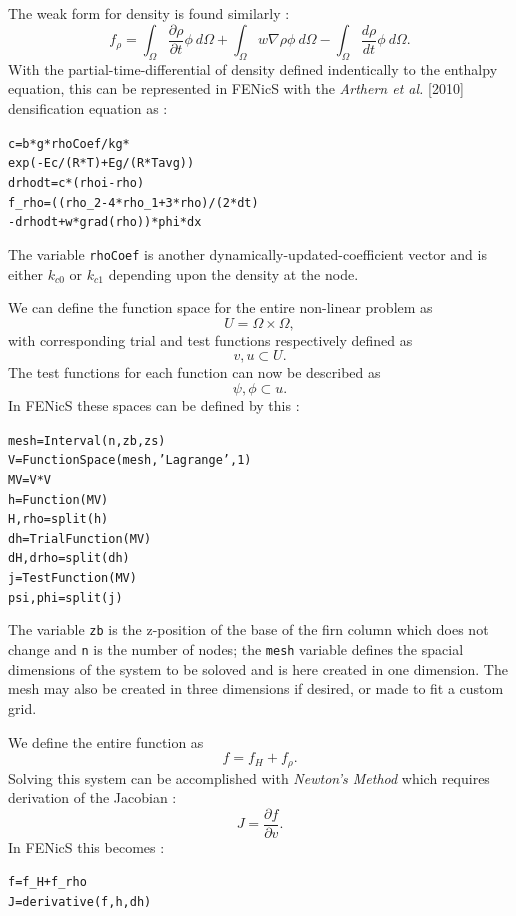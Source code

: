 \documentclass{article}%
\begin{document}
The weak form for density is found similarly :
  $$
  f_{\rho} = 
    \int_{\Omega} \frac{\partial \rho}{\partial t}\phi\ d \Omega + 
    \int_{\Omega} w\nabla \rho \phi\ d \Omega -
    \int_{\Omega}\frac{d \rho}{dt}\phi\ d \Omega.
  $$
With the partial-time-differential of density defined indentically to the enthalpy equation, this can be represented in FENicS with the \emph{Arthern et al.} [2010] densification equation as :\par
\footnotesize
\begin{alltt}
c      = b*g*rhoCoef/kg * 
         exp(-Ec/(R*T) + Eg/(R*Tavg))
drhodt = c*(rhoi - rho)
f_rho  = ((rho_2 - 4*rho_1 + 3*rho)/(2*dt) 
         - drhodt + w*grad(rho))*phi*dx 
\end{alltt}
\normalsize
The variable \texttt{rhoCoef} is another dynamically-updated-coefficient vector and is either $k_{c0}$ or $k_{c1}$ depending upon the density at the node.

We can define the function space for the entire non-linear problem as 
  $$
    U = \Omega \times \Omega,
  $$
with corresponding trial and test functions respectively defined as
  $$
    v, u \subset U.
  $$
The test functions for each function can now be described as
  $$
    \psi, \phi \subset u.
  $$
In FENicS these spaces can be defined by this :
\footnotesize
\begin{alltt}
mesh     = Interval(n, zb, zs)
V        = FunctionSpace(mesh, 'Lagrange', 1)
MV       = V*V
h        = Function(MV)
H,rho    = split(h)    
dh       = TrialFunction(MV)
dH, drho = split(dh)
j        = TestFunction(MV)
psi, phi = split(j)
\end{alltt}
\normalsize
The variable \texttt{zb} is the z-position of the base of the firn column which does not change and \texttt{n} is the number of nodes; the \texttt{mesh} variable defines the spacial dimensions of the system to be soloved and is here created in one dimension.  The mesh may also be created in three dimensions if desired, or made to fit a custom grid.

We define the entire function as 
  $$
    f = f_H + f_{\rho}.
  $$
Solving this system can be accomplished with \emph{Newton's Method} which requires derivation of the Jacobian :
  $$
    J = \frac{\partial f}{\partial v}.
  $$
In FENicS this becomes :
\footnotesize
\begin{alltt}
f  = f_H + f_rho
J  = derivative(f, h, dh)
\end{alltt}
\normalsize


\end{document}
